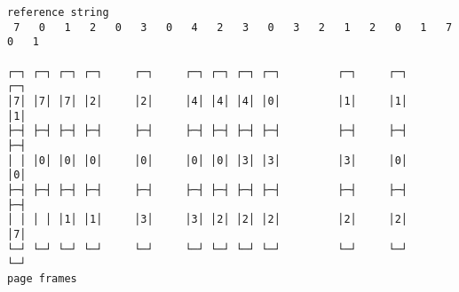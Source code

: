 \documentclass[varwidth=20cm,crop]{standalone}
\begin{document}
\begin{verbatim}
reference string
 7   0   1   2   0   3   0   4   2   3   0   3   2   1   2   0   1   7   0   1

┌─┐ ┌─┐ ┌─┐ ┌─┐     ┌─┐     ┌─┐ ┌─┐ ┌─┐ ┌─┐         ┌─┐     ┌─┐     ┌─┐
│7│ │7│ │7│ │2│     │2│     │4│ │4│ │4│ │0│         │1│     │1│     │1│
├─┤ ├─┤ ├─┤ ├─┤     ├─┤     ├─┤ ├─┤ ├─┤ ├─┤         ├─┤     ├─┤     ├─┤
│ │ │0│ │0│ │0│     │0│     │0│ │0│ │3│ │3│         │3│     │0│     │0│
├─┤ ├─┤ ├─┤ ├─┤     ├─┤     ├─┤ ├─┤ ├─┤ ├─┤         ├─┤     ├─┤     ├─┤
│ │ │ │ │1│ │1│     │3│     │3│ │2│ │2│ │2│         │2│     │2│     │7│
└─┘ └─┘ └─┘ └─┘     └─┘     └─┘ └─┘ └─┘ └─┘         └─┘     └─┘     └─┘
page frames
\end{verbatim}
\end{document}
